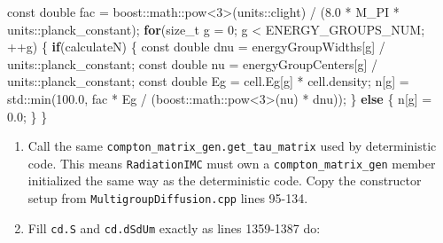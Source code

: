 \documentclass[
]{article}
\newenvironment{Shaded}{}{}
\newcommand{\AttributeTok}[1]{\textcolor[rgb]{0.49,0.56,0.16}{#1}}
\newcommand{\BuiltInTok}[1]{\textcolor[rgb]{0.00,0.50,0.00}{#1}}
\newcommand{\ControlFlowTok}[1]{\textcolor[rgb]{0.00,0.44,0.13}{\textbf{#1}}}
\newcommand{\DataTypeTok}[1]{\textcolor[rgb]{0.56,0.13,0.00}{#1}}
\newcommand{\DecValTok}[1]{\textcolor[rgb]{0.25,0.63,0.44}{#1}}
\newcommand{\ExtensionTok}[1]{#1}
\newcommand{\FloatTok}[1]{\textcolor[rgb]{0.25,0.63,0.44}{#1}}
\newcommand{\NormalTok}[1]{#1}
\newcommand{\OperatorTok}[1]{\textcolor[rgb]{0.40,0.40,0.40}{#1}}
\begin{document}
\begin{Shaded}
\begin{Highlighting}[]
\AttributeTok{const} \DataTypeTok{double}\NormalTok{ fac }\OperatorTok{=} \ExtensionTok{boost::}\NormalTok{math::pow}\OperatorTok{\textless{}}\DecValTok{3}\OperatorTok{\textgreater{}(}\NormalTok{units}\OperatorTok{::}\NormalTok{clight}\OperatorTok{)} \OperatorTok{/} \OperatorTok{(}\FloatTok{8.0} \OperatorTok{*}\NormalTok{ M\_PI }\OperatorTok{*}\NormalTok{ units}\OperatorTok{::}\NormalTok{planck\_constant}\OperatorTok{);}
\ControlFlowTok{for}\OperatorTok{(}\DataTypeTok{size\_t}\NormalTok{ g }\OperatorTok{=} \DecValTok{0}\OperatorTok{;}\NormalTok{ g }\OperatorTok{\textless{}}\NormalTok{ ENERGY\_GROUPS\_NUM}\OperatorTok{;} \OperatorTok{++}\NormalTok{g}\OperatorTok{)}
\OperatorTok{\{}
    \ControlFlowTok{if}\OperatorTok{(}\NormalTok{calculateN}\OperatorTok{)}
    \OperatorTok{\{}
        \AttributeTok{const} \DataTypeTok{double}\NormalTok{ dnu }\OperatorTok{=}\NormalTok{ energyGroupWidths}\OperatorTok{[}\NormalTok{g}\OperatorTok{]} \OperatorTok{/}\NormalTok{ units}\OperatorTok{::}\NormalTok{planck\_constant}\OperatorTok{;}
        \AttributeTok{const} \DataTypeTok{double}\NormalTok{ nu }\OperatorTok{=}\NormalTok{ energyGroupCenters}\OperatorTok{[}\NormalTok{g}\OperatorTok{]} \OperatorTok{/}\NormalTok{ units}\OperatorTok{::}\NormalTok{planck\_constant}\OperatorTok{;}
        \AttributeTok{const} \DataTypeTok{double}\NormalTok{ Eg }\OperatorTok{=}\NormalTok{ cell}\OperatorTok{.}\NormalTok{Eg}\OperatorTok{[}\NormalTok{g}\OperatorTok{]} \OperatorTok{*}\NormalTok{ cell}\OperatorTok{.}\NormalTok{density}\OperatorTok{;}
\NormalTok{        n}\OperatorTok{[}\NormalTok{g}\OperatorTok{]} \OperatorTok{=} \BuiltInTok{std::}\NormalTok{min}\OperatorTok{(}\FloatTok{100.0}\OperatorTok{,}\NormalTok{ fac }\OperatorTok{*}\NormalTok{ Eg }\OperatorTok{/} \OperatorTok{(}\ExtensionTok{boost::}\NormalTok{math::pow}\OperatorTok{\textless{}}\DecValTok{3}\OperatorTok{\textgreater{}(}\NormalTok{nu}\OperatorTok{)} \OperatorTok{*}\NormalTok{ dnu}\OperatorTok{));}
    \OperatorTok{\}}
    \ControlFlowTok{else}
    \OperatorTok{\{}
\NormalTok{        n}\OperatorTok{[}\NormalTok{g}\OperatorTok{]} \OperatorTok{=} \FloatTok{0.0}\OperatorTok{;}
    \OperatorTok{\}}
\OperatorTok{\}}
\end{Highlighting}
\end{Shaded}

\begin{enumerate}
\def\labelenumi{\arabic{enumi}.}
\setcounter{enumi}{1}
\item
  Call the same \texttt{compton\_matrix\_gen.get\_tau\_matrix} used by
  deterministic code. This means \texttt{RadiationIMC} must own a
  \texttt{compton\_matrix\_gen} member initialized the same way as the
  deterministic code. Copy the constructor setup from
  \texttt{MultigroupDiffusion.cpp} lines 95-134.
\item
  Fill \texttt{cd.S} and \texttt{cd.dSdUm} exactly as lines 1359-1387
  do:
\end{enumerate}
\end{document}
